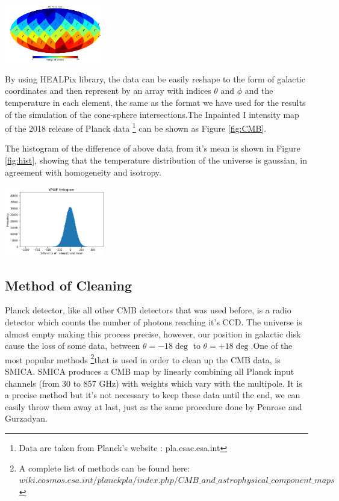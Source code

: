 \documentclass{article}
\begin{document}
\begin{multicols}{2}
\hspace{+1.8cm}\includegraphics[width=0.32\textwidth]{index.png}
\label{fig:fig4}
\medskip

By using HEALPix library, the data can be easily reshape to the form of galactic coordinates and then represent by an array with indices $\theta$ and $\phi$ and the temperature in each element, the same as the format we have used for the results of the simulation of the cone-sphere intersections.The Inpainted I intensity map of the 2018 release of Planck data \footnote{Data are taken from Planck's website : pla.esac.esa.int} can be shown as Figure \ref{fig:CMB}.

The histogram of the difference of above data from it's mean is shown in Figure \ref{fig:hist}, showing that the temperature distribution of the universe is gaussian, in agreement with homogeneity and isotropy.

\hspace{+1cm}\includegraphics[width=0.33\textwidth]{hist.png}
\label{fig:hist}

\subsection{Method of Cleaning}
Planck detector, like all other CMB detectors that was used before, is a radio detector which counts the number of photons reaching it's CCD. The universe is almost empty making this process precise, however, our position in galactic disk cause the loss of some data, between $\theta=-18\deg$ to $\theta=+18\deg$.One of the most popular methods \footnote{A complete list of methods can be found here:$wiki.cosmos.esa.int/planckpla/index.php/CMB\_and\_astrophysical\_component\_maps$}that is used in order to clean up the CMB data, is SMICA. SMICA produces a CMB map by linearly combining all Planck input channels (from 30 to 857 GHz) with weights which vary with the multipole. It is a precise method but it's not necessary to keep these data until the end, we can easily throw them away at last, just as the same procedure done by Penrose and Gurzadyan\cite{ring}.


\end{multicols}
\end{document}
